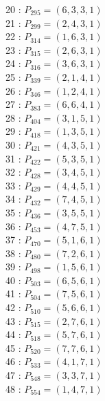 \documentclass{article}
\begin{document}
{\begin{multicols}{2}
20 : $P_{295}=( 6, 3, 3, 1 )$\\
21 : $P_{299}=( 2, 4, 3, 1 )$\\
22 : $P_{314}=( 1, 6, 3, 1 )$\\
23 : $P_{315}=( 2, 6, 3, 1 )$\\
24 : $P_{316}=( 3, 6, 3, 1 )$\\
25 : $P_{339}=( 2, 1, 4, 1 )$\\
26 : $P_{346}=( 1, 2, 4, 1 )$\\
27 : $P_{383}=( 6, 6, 4, 1 )$\\
28 : $P_{404}=( 3, 1, 5, 1 )$\\
29 : $P_{418}=( 1, 3, 5, 1 )$\\
30 : $P_{421}=( 4, 3, 5, 1 )$\\
31 : $P_{422}=( 5, 3, 5, 1 )$\\
32 : $P_{428}=( 3, 4, 5, 1 )$\\
33 : $P_{429}=( 4, 4, 5, 1 )$\\
34 : $P_{432}=( 7, 4, 5, 1 )$\\
35 : $P_{436}=( 3, 5, 5, 1 )$\\
36 : $P_{453}=( 4, 7, 5, 1 )$\\
37 : $P_{470}=( 5, 1, 6, 1 )$\\
38 : $P_{480}=( 7, 2, 6, 1 )$\\
39 : $P_{498}=( 1, 5, 6, 1 )$\\
40 : $P_{503}=( 6, 5, 6, 1 )$\\
41 : $P_{504}=( 7, 5, 6, 1 )$\\
42 : $P_{510}=( 5, 6, 6, 1 )$\\
43 : $P_{515}=( 2, 7, 6, 1 )$\\
44 : $P_{518}=( 5, 7, 6, 1 )$\\
45 : $P_{520}=( 7, 7, 6, 1 )$\\
46 : $P_{533}=( 4, 1, 7, 1 )$\\
47 : $P_{548}=( 3, 3, 7, 1 )$\\
48 : $P_{554}=( 1, 4, 7, 1 )$\\
\end{multicols}
}
\end{document}
